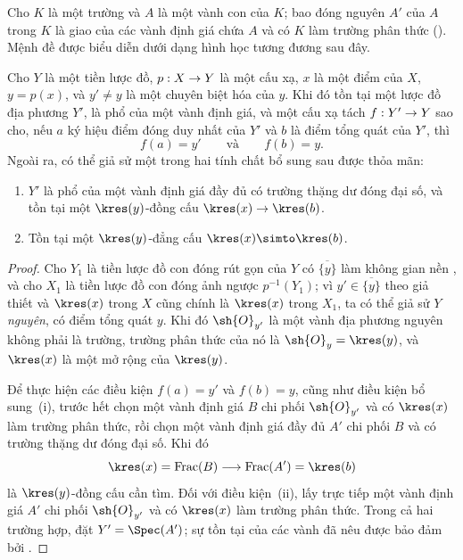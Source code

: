 \documentclass[oneside,10pt]{amsart}
\makeatletter
\newcommand{\ega@arrow}[2]{\mathchoice{#1}{#2}{#2}{#2}}
\renewcommand{\to}{\ega@arrow{\longrightarrow}{\rightarrow}}
\def\Frac{\operatorname{Frac}}
\let\EGAOriginalLabel\label
\renewcommand{\label}[1]{\phantomsection\EGAOriginalLabel{#1}}
\makeatother
\begin{document}
\begin{env}[7.1.3]
\label{II.7.1.3}
Cho $K$ là một trường và $A$ là một vành con của $K$;
bao đóng nguyên $A'$ của $A$ trong $K$ là giao của các vành định giá chứa $A$ và có $K$ làm trường phân thức (\cite[p.~51, Định lý~2]{I-11}).
Mệnh đề  được biểu diễn dưới dạng hình học tương đương sau đây.
\end{env}

\begin{proposition}[7.1.4]
\label{II.7.1.4}
Cho $Y$ là một tiền lược đồ, $p:X\to Y$ là một cấu xạ, $x$ là một điểm của $X$, $y=p(x)$, và $y'\neq y$ là một chuyên biệt hóa  của $y$.
Khi đó tồn tại một lược đồ địa phương $Y'$, là phổ của một vành định giá, và một cấu xạ tách $f:Y'\to Y$ sao cho, nếu $a$ ký hiệu điểm đóng duy nhất của $Y'$ và $b$ là điểm tổng quát của $Y'$, thì
\[
  f(a)=y'
  \qquad\text{và}\qquad
  f(b)=y.
\]
Ngoài ra, có thể giả sử một trong hai tính chất bổ sung sau được thỏa mãn:
\begin{enumerate}
  \item[\rm{(i)}] $Y'$ là phổ của một vành định giá đầy đủ có trường thặng dư đóng đại số, và tồn tại một $\kres(y)$-đồng cấu $\kres(x)\to\kres(b)$.
  \item[\rm{(ii)}] Tồn tại một $\kres(y)$-đẳng cấu $\kres(x)\simto\kres(b)$.
\end{enumerate}
\end{proposition}

\begin{proof}
Cho $Y_1$ là tiền lược đồ con đóng rút gọn của $Y$ có $\overline{\{y\}}$ làm không gian nền , và cho $X_1$ là tiền lược đồ con đóng ảnh ngược $p^{-1}(Y_1)$;
vì $y'\in\overline{\{y\}}$ theo giả thiết và $\kres(x)$ trong $X$ cũng chính là $\kres(x)$ trong $X_1$, ta có thể giả sử $Y$ \emph{nguyên}, có điểm tổng quát $y$.
Khi đó $\sh{O}_{y'}$ là một vành địa phương nguyên không phải là trường, trường phân thức của nó là $\sh{O}_y=\kres(y)$, và $\kres(x)$ là một mở rộng của $\kres(y)$.

Để thực hiện các điều kiện $f(a)=y'$ và $f(b)=y$, cũng như điều kiện bổ sung~(i), trước hết chọn một vành định giá $B$ chi phối $\sh{O}_{y'}$ và có $\kres(x)$ làm trường phân thức, rồi chọn một vành định giá đầy đủ $A'$ chi phối $B$ và có trường thặng dư đóng đại số.
Khi đó
\[
  \kres(x)=\Frac(B)\longrightarrow\Frac(A')=\kres(b)
\]
là $\kres(y)$-đồng cấu cần tìm.
Đối với điều kiện~(ii), lấy trực tiếp một vành định giá $A'$ chi phối $\sh{O}_{y'}$ và có $\kres(x)$ làm trường phân thức.
Trong cả hai trường hợp, đặt $Y'=\Spec(A')$; sự tồn tại của các vành đã nêu được bảo đảm bởi .
\end{proof}
\end{document}
